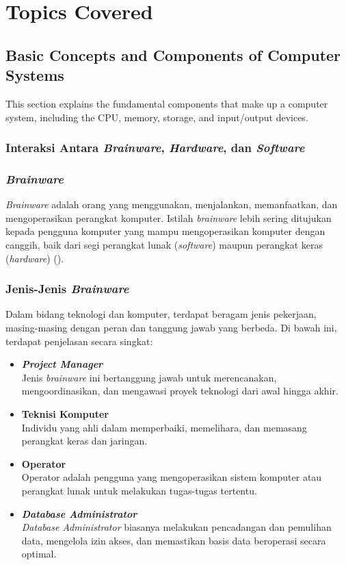 \documentclass[12pt]{article}
\begin{document}
\section{Topics Covered}

\subsection{Basic Concepts and Components of Computer Systems}
This section explains the fundamental components that make up a computer system, including the CPU, memory, storage, and input/output devices.

\subsubsection{Interaksi Antara \textit{Brainware}, \textit{Hardware}, dan \textit{Software}}

\subsubsection*{\textit{Brainware}}
\hspace{0.5cm} \textit{Brainware} adalah orang yang menggunakan, menjalankan, memanfaatkan, dan mengoperasikan perangkat komputer. Istilah \textit{brainware} lebih sering ditujukan kepada pengguna komputer yang mampu mengoperasikan komputer dengan canggih, baik dari segi perangkat lunak (\textit{software}) maupun perangkat keras (\textit{hardware}) (\cite{brainwareKompas}).

\subsubsection*{Jenis-Jenis \textit{Brainware}}
\hspace{0.5cm} Dalam bidang teknologi dan komputer, terdapat beragam jenis pekerjaan, masing-masing dengan peran dan tanggung jawab yang berbeda. Di bawah ini, terdapat penjelasan secara singkat:
\begin{itemize}
    \item \textbf{\textit{Project Manager}}
    \\Jenis \textit{brainware} ini bertanggung jawab untuk merencanakan, mengoordinasikan, dan mengawasi proyek teknologi dari awal hingga akhir.
    \item \textbf{Teknisi Komputer}
    \\Individu yang ahli dalam memperbaiki, memelihara, dan memasang perangkat keras dan jaringan.
    \item \textbf{Operator}
    \\Operator adalah pengguna yang mengoperasikan sistem komputer atau perangkat lunak untuk melakukan tugas-tugas tertentu.
    \item \textbf{\textit{Database Administrator}}
    \\\textit{Database Administrator} biasanya melakukan pencadangan dan pemulihan data, mengelola izin akses, dan memastikan basis data beroperasi secara optimal.
\end{itemize}
\end{document}
